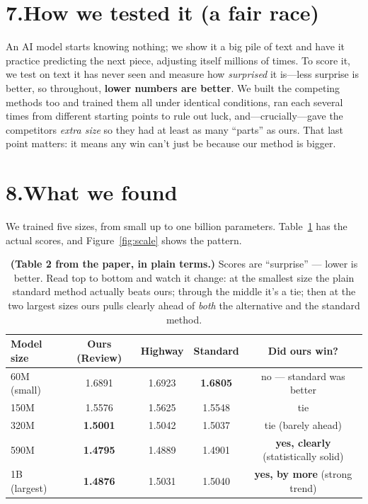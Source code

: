 \documentclass[12pt]{article}
\begin{document}
\section*{7.\quad How we tested it (a fair race)}
An AI model starts knowing nothing; we show it a big pile of text and have it practice predicting the next
piece, adjusting itself millions of times. To score it, we test on text it has never seen and measure how
\emph{surprised} it is---less surprise is better, so throughout, \textbf{lower numbers are better}. We built
the competing methods too and trained them all under identical conditions, ran each several times from
different starting points to rule out luck, and---crucially---gave the competitors \emph{extra size} so they
had at least as many ``parts'' as ours. That last point matters: it means any win can't just be because our
method is bigger.

\section*{8.\quad What we found}
We trained five sizes, from small up to one billion parameters. Table~\ref{tab:res} has the actual scores, and
Figure~\ref{fig:scale} shows the pattern.

\begin{table}[h]
\centering
\small
\begin{tabular}{@{}lcccc@{}}
\toprule
\textbf{Model size} & \textbf{Ours (Review)} & \textbf{Highway} & \textbf{Standard} & \textbf{Did ours win?}\\
\midrule
60M (small)      & 1.6891 & 1.6923 & \textbf{1.6805} & no --- standard was better\\
150M             & 1.5576 & 1.5625 & 1.5548 & tie\\
320M             & \textbf{1.5001} & 1.5042 & 1.5037 & tie (barely ahead)\\
590M             & \textbf{1.4795} & 1.4889 & 1.4901 & \textbf{yes, clearly} (statistically solid)\\
1B (largest)     & \textbf{1.4876} & 1.5031 & 1.5040 & \textbf{yes, by more} (strong trend)\\
\bottomrule
\end{tabular}
\caption{\textbf{(Table 2 from the paper, in plain terms.)} Scores are ``surprise'' --- lower is better. Read
top to bottom and watch it change: at the smallest size the plain standard method actually beats ours; through
the middle it's a tie; then at the two largest sizes ours pulls clearly ahead of \emph{both} the alternative
and the standard method.}
\label{tab:res}
\end{table}
\end{document}
